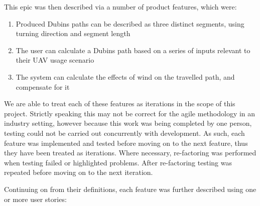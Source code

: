 This epic was then described via a number of product features, which were:
\begin{enumerate}
	\item Produced Dubins paths can be described as three distinct segments, using turning direction and segment length
	\item The user can calculate a Dubins path based on a series of inputs relevant to their UAV usage scenario
	\item The system can calculate the effects of wind on the travelled path, and compensate for it
\end{enumerate}

We are able to treat each of these features as iterations in the scope of this project. Strictly speaking this may not be correct for the agile methodology in an industry setting, however because this work was being completed by one person, testing could not be carried out concurrently with development. As such, each feature was implemented and tested before moving on to the next feature, thus they have been treated as iterations. Where necessary, re-factoring was performed when testing failed or highlighted problems. After re-factoring testing was repeated before moving on to the next iteration.

Continuing on from their definitions, each feature was further described using one or more user stories:

